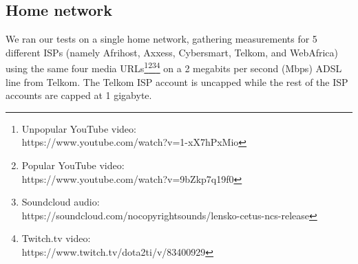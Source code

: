\documentclass{sig-alternate-05-2015}
\begin{document}
\subsection{Home network}
We ran our tests on a single home network, gathering measurements for 5 different ISPs (namely Afrihost, Axxess, Cybersmart, Telkom, and WebAfrica) using the same four media URLs\footnote{Unpopular YouTube video: \\ https://www.youtube.com/watch?v=1-xX7hPxMio}\footnote{Popular YouTube video: \\ https://www.youtube.com/watch?v=9bZkp7q19f0}\footnote{Soundcloud audio: \\ https://soundcloud.com/nocopyrightsounds/lensko-cetus-ncs-release}\footnote{Twitch.tv video: \\https://www.twitch.tv/dota2ti/v/83400929} on a 2 megabits per second (Mbps) ADSL line from Telkom. The Telkom ISP account is uncapped while the rest of the ISP accounts are capped at 1 gigabyte.
\end{document}
